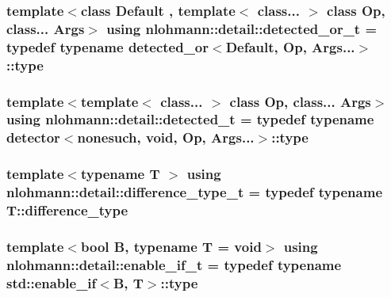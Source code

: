 \subsubsection[{\texorpdfstring{detected\+\_\+or\+\_\+t}{detected_or_t}}]{\setlength{\rightskip}{0pt plus 5cm}template$<$class Default , template$<$ class... $>$ class Op, class... Args$>$ using {\bf nlohmann\+::detail\+::detected\+\_\+or\+\_\+t} = typedef typename {\bf detected\+\_\+or}$<$Default, Op, Args...$>$\+::type}\hypertarget{namespacenlohmann_1_1detail_a7ac5b8ef0363101275a2827b3b117dcf}{}\label{namespacenlohmann_1_1detail_a7ac5b8ef0363101275a2827b3b117dcf}
\subsubsection[{\texorpdfstring{detected\+\_\+t}{detected_t}}]{\setlength{\rightskip}{0pt plus 5cm}template$<$template$<$ class... $>$ class Op, class... Args$>$ using {\bf nlohmann\+::detail\+::detected\+\_\+t} = typedef typename {\bf detector}$<${\bf nonesuch}, {\bf void}, Op, Args...$>$\+::type}\hypertarget{namespacenlohmann_1_1detail_a37e97a32d0b94ce5f745427e4e40204d}{}\label{namespacenlohmann_1_1detail_a37e97a32d0b94ce5f745427e4e40204d}
\subsubsection[{\texorpdfstring{difference\+\_\+type\+\_\+t}{difference_type_t}}]{\setlength{\rightskip}{0pt plus 5cm}template$<$typename T $>$ using {\bf nlohmann\+::detail\+::difference\+\_\+type\+\_\+t} = typedef typename T\+::difference\+\_\+type}\hypertarget{namespacenlohmann_1_1detail_a3603b59a17d1c5e15050743b847992f2}{}\label{namespacenlohmann_1_1detail_a3603b59a17d1c5e15050743b847992f2}
\subsubsection[{\texorpdfstring{enable\+\_\+if\+\_\+t}{enable_if_t}}]{\setlength{\rightskip}{0pt plus 5cm}template$<$bool B, typename T  = void$>$ using {\bf nlohmann\+::detail\+::enable\+\_\+if\+\_\+t} = typedef typename std\+::enable\+\_\+if$<$B, T$>$\+::type}\hypertarget{namespacenlohmann_1_1detail_a02bcbc878bee413f25b985ada771aa9c}{}\label{namespacenlohmann_1_1detail_a02bcbc878bee413f25b985ada771aa9c}
